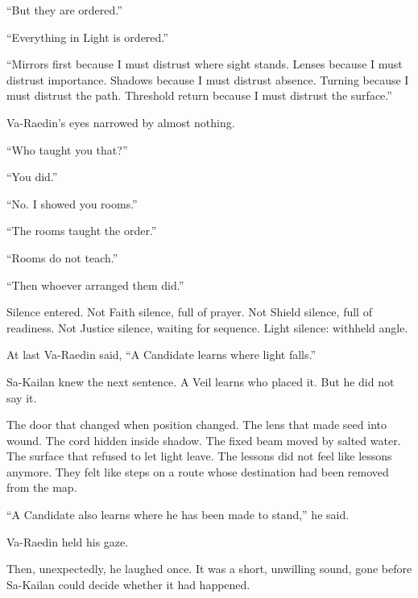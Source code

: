 “But they are ordered.”\par

“Everything in Light is ordered.”\par

“Mirrors first because I must distrust where sight stands.
Lenses because I must distrust importance.
Shadows because I must distrust absence.
Turning because I must distrust the path.
Threshold return because I must distrust the surface.”\par

Va-Raedin’s eyes narrowed by almost nothing.\par

“Who taught you that?”\par

“You did.”\par

“No.
I showed you rooms.”\par

“The rooms taught the order.”\par

“Rooms do not teach.”\par

“Then whoever arranged them did.”\par

Silence entered.
Not Faith silence, full of prayer.
Not Shield silence, full of readiness.
Not Justice silence, waiting for sequence.
Light silence: withheld angle.\par

At last Va-Raedin said, “A Candidate learns where light falls.”\par

Sa-Kailan knew the next sentence.
A Veil learns who placed it.
But he did not say it.\par

The door that changed when position changed.
The lens that made seed into wound.
The cord hidden inside shadow.
The fixed beam moved by salted water.
The surface that refused to let light leave.
The lessons did not feel like lessons anymore.
They felt like steps on a route whose destination had been removed from the map.\par

“A Candidate also learns where he has been made to stand,” he said.\par

Va-Raedin held his gaze.\par

Then, unexpectedly, he laughed once.
It was a short, unwilling sound, gone before Sa-Kailan could decide whether it had happened.\par

